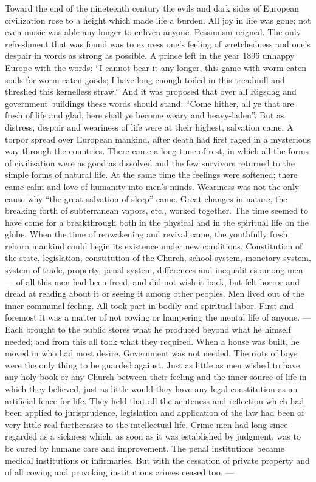\documentclass[12pt,a4paper,openany]{book}
\newcommand{\opage}[1]{\marginnote{\footnotesize\textit{[#1]}}}
\begin{document}
Toward the end of the nineteenth century the
evils and dark sides of European civilization rose to
a height which made life a burden. All joy in life was
gone; not even music was able any longer to enliven anyone.
Pessimism reigned. The only refreshment that was found
was to express one's feeling of wretchedness and one's despair
in words as strong as possible. A prince left in the year
\opage{110}1896 unhappy Europe with the words: ``I cannot
bear it any longer, this game with worm-eaten souls for
worm-eaten goods; I have long enough toiled in this treadmill
and threshed this kernelless straw.'' And it was proposed that
over all Rigsdag and government buildings these
words should stand: ``Come hither, all ye that are fresh of life and glad, here
shall ye become weary and heavy-laden''. But as distress,
despair and weariness of life were at their highest, salvation came.
A torpor spread over European
mankind, after death had first raged in a mysterious way
through the countries. There came a long time of rest, in
which all the forms of civilization were as good as dissolved
and the few survivors returned to the simple
forms of natural life. At the same time the feelings were softened; there came calm and
love of humanity into men's minds. Weariness was not the only
cause why ``the great salvation of sleep'' came. Great changes
in nature, the breaking forth of subterranean vapors, etc., worked
together. The time seemed to have come for a breakthrough both
in the physical and in the spiritual life on the globe. When
the time of reawakening and revival came, the
youthfully fresh, reborn mankind could begin its existence
under new conditions. Constitution of the state, legislation,
constitution of the Church, school system, monetary system, system of trade, property,
penal system, differences and inequalities among men --- of all
this men had been freed, and did not wish it back,
but felt horror and dread at reading about it or seeing it
among other peoples. Men lived out of the inner
communal feeling. All took part in bodily and spiritual labor. First
and foremost it was a matter of not cowing or hampering the
mental life of anyone. --- Each brought to the public stores
what he produced beyond what he himself needed; and from this
all took what they required. When a house was built,
he moved in who had most desire. Government was not needed.
The riots of boys were the only thing to be guarded
against. Just as little as men wished to have any
holy book or any Church between their feeling and the inner
source of life in which they believed, just as little would they have
any legal constitution as an artificial fence for life. They
\opage{111}held that all the acuteness and reflection which
had been applied to jurisprudence, legislation and
application of the law had been of very little real furtherance to
the intellectual life. Crime men had long since regarded
as a sickness which, as soon as it was established by judgment,
was to be cured by humane care and improvement.
The penal institutions became medical institutions or infirmaries. But
with the cessation of private property and of all cowing and provoking
institutions crimes ceased too. ---
\end{document}
